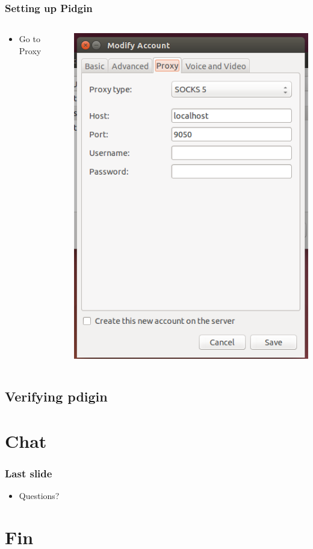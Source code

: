\documentclass{beamer}
\begin{document}
\begin{frame}
\frametitle{Setting up Pidgin}
\begin{columns}
    \begin{column}{0.48\textwidth}
        \begin{itemize}
          \item Go to Proxy
        \end{itemize}
    \end{column}
    \begin{column}{.5\textwidth}
        \includegraphics[width=.9\linewidth]{pidgin_proxy}
    \end{column}
\end{columns}
\end{frame}
\subsection{Verifying pdigin}
\section{Chat}
\begin{frame}
\frametitle{Last slide}
\begin{itemize}
\item Questions?
\end{itemize}
\end{frame}
\section{Fin}
\end{document}
